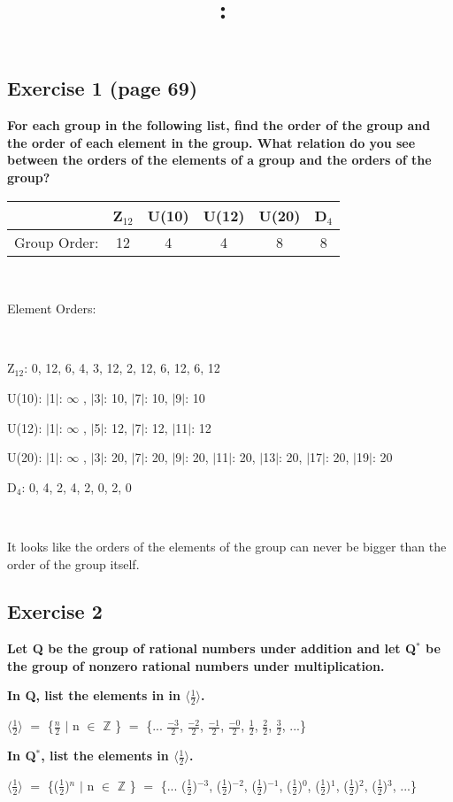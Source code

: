 \documentclass{article}
\title{
    \vspace{2in}
    \textmd{\textbf{\hmwkClass:\ \hmwkTitle}}\\
    \normalsize\vspace{0.1in}\small\vspace{0.1in}\large{\textit{\hmwkClassInstructor}}
    \vspace{3in}
}
\author{\hmwkAuthorName}
\date{}
\newcommand{\mt}[1]{\ensuremath{#1}}
\newcommand\ssc[2][\DefaultOpt]{%
  \def\DefaultOpt{#2}%
  \subsection[#1]{#2}%
}
\newcommand{\bz}{\mt{\mathbb{Z}} }       %
\newcommand{\mem}{\mt{\in} }
\newcommand{\av}[1]{\mt{|}#1\mt{|}}  %
\newcommand{\bk}[1]{\{#1\}}
\newcommand{\eql}{\mt{=} }
\newcommand{\uw}[2]{#1\mt{_{#2}}}
\newcommand{\uf}[2]{#1\mt{^{#2}}}
\newcommand{\frc}[2]{\mt{\frac{#1}{#2}}}
\newcommand{\infy}{\mt{\infty} }
\newcommand{\dvd}{ \mt{\vert} }
\begin{document}
\ssc{Exercise 1 (page 69)}{

\textbf{For each group in the following list, find the order of the group and the order of each element in the group. What relation do you see between the orders of the elements of a group and the orders of the group?}

\begin{tabular}{l|ccccc}
  & \uw{Z}{12} & U(10) & U(12) & U(20) & \uw{D}{4} \\
  \hline
  Group Order: & 12 & 4 & 4 & 8 & 8
\end{tabular}

\

Element Orders:

\

\uw{Z}{12}: 0, 12, 6, 4, 3, 12, 2, 12, 6, 12, 6, 12

U(10): \av{1}: \infy, \av{3}: 10, \av{7}: 10, \av{9}: 10

U(12): \av{1}: \infy, \av{5}: 12, \av{7}: 12, \av{11}: 12

U(20): \av{1}: \infy, \av{3}: 20, \av{7}: 20, \av{9}: 20, \av{11}: 20, \av{13}: 20, \av{17}: 20, \av{19}: 20

\uw{D}{4}: 0, 4, 2, 4, 2, 0, 2, 0

\

It looks like the orders of the elements of the group can never be bigger than the order of the group itself.

}
\ssc{Exercise 2}{

\textbf{Let Q be the group of rational numbers under addition and let \uf{Q}{*} be the group of nonzero rational numbers under multiplication.}

\textbf{In Q, list the elements in in $\langle$\frc{1}{2	}$\rangle$.}

$\langle$\frc{1}{2}$\rangle$ \eql \bk{\frc{n}{2} \dvd n \mem \bz} \eql \bk{... \frc{-3}{2}, \frc{-2}{2}, \frc{-1}{2}, \frc{-0}{2}, \frc{1}{2}, \frc{2}{2}, \frc{3}{2}, ...}

\textbf{In \uf{Q}{*}, list the elements in $\langle$\frc{1}{2}$\rangle$.}

$\langle$\frc{1}{2}$\rangle$ \eql \bk{(\frc{1}{2})$^n$ \dvd n \mem \bz} \eql \bk{... \uf{(\frc{1}{2})}{-3}, \uf{(\frc{1}{2})}{-2}, \uf{(\frc{1}{2})}{-1}, \uf{(\frc{1}{2})}{0}, \uf{(\frc{1}{2})}{1}, \uf{(\frc{1}{2})}{2}, \uf{(\frc{1}{2})}{3},  ...}

}
\end{document}
